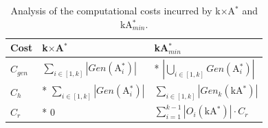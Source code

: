 \documentclass{aicom2e}
\newcommand{\kgs}{$k$GP}
\newcommand{\kastar}{kA$^*$}
\newcommand{\kastarmin}{kA$^*_{min}$}
\newcommand{\kxastar}{k$\times$A$^*$}
\newcommand{\astari}[1]{A$^*_#1$}
\newcommand{\open}{\textsc{Open}}
\begin{document}

\begin{table}
    \begin{tabular}{|l|l|l|}
        \hline
        Cost        & \kxastar{}                                    & \kastarmin \\ \hline
        $C_{gen}$   & $\sum\limits_{i\in[1,k]} |Gen(\text{\astari{i}})|$       & * $|\bigcup\limits_{i\in[1,k]} Gen(\text{\astari{i}})|$\\
        $C_{h}$     & * $\sum\limits_{i\in[1,k]} |Gen(\text{\astari{i}})|$     & $\sum\limits_{i\in[1,k]} |Gen_k(\text{\kastar{}})|$\\
        $C_r$       & *  0                                               & $\sum\limits_{i=1}^{k-1} |O_i(\text{\kastar{}})|\cdot C_r$\\
        \hline
    \end{tabular}
       \caption{Analysis of the computational costs incurred by \kxastar{} and \kastarmin{}.}
   \label{tab:time-analysis}
\end{table}
\end{document}
